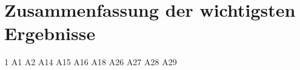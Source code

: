 \section{Zusammenfassung der wichtigsten Ergebnisse}\label{sec:ZusammenfassungErgebnisse}
1 \cite{1}
 \cite{2}
 \cite{3}
 \cite{6}
 \cite{7}
 \cite{8}
 \cite{9}
 \cite{10}
 \cite{11}
 \cite{12}
 \cite{13}
 \cite{14}
 \cite{15}
 \cite{16}
 \cite{17}
 \cite{19}
 \cite{20}
 \cite{21}
 \cite{22}
 \cite{23}
 \cite{24}
 \cite{25}
 \cite{26}
 \cite{27}
 \cite{28}
 \cite{29}
 \cite{30}
 \cite{31}
 \cite{32}
\newline
A1 \cite{A1}
\newline
A2 \cite{A2}
\newline
A14 \cite{A14}
\newline
A15 \cite{A15}
\newline
A16 \cite{A16}
\newline
A18 \cite{A18}
\newline
A26 \cite{A26}
\newline
A27 \cite{A27}
\newline
A28 \cite{A28}
\newline
A29 \cite{A29}
\newline
